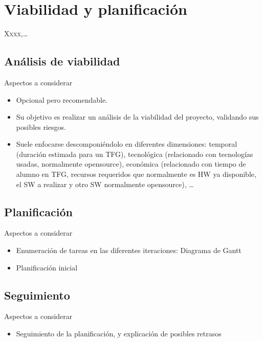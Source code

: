 \chapter{Viabilidad y planificación}
\label{chap:planificacion}

\lettrine{X}{xxx},\dots


\section{Análisis de viabilidad}
\label{sec:viabilidad}

{ \color{red} Aspectos a considerar
    \begin{itemize}
      \item Opcional pero recomendable.
      \item Su objetivo es realizar un análisis de la viabilidad del proyecto, validando sus posibles riesgos.
      \item Suele enfocarse descomponiéndolo en diferentes dimensiones: temporal (duración estimada para un TFG), tecnológica (relacionado con tecnologías usadas, normalmente opensource), económica (relacionado con tiempo de alumno en TFG, recursos requeridos que normalmente es HW ya disponible, el SW a realizar y otro SW normalmente opensource), \dots 
    \end{itemize}
}

\section{Planificación}
\label{sec:planificacion}

{ \color{red} Aspectos a considerar
    \begin{itemize}
      \item Enumeración de tareas en las diferentes iteraciones: Diagrama de Gantt
      \item Planificación inicial
    \end{itemize}
}

\section{Seguimiento}
\label{sec:planificacion}

{ \color{red} Aspectos a considerar
    \begin{itemize}
      \item Seguimiento de la planificación, y explicación de posibles retrasos
    \end{itemize}
}

